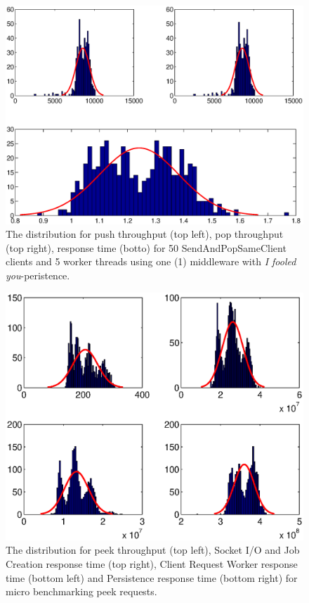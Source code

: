 \documentclass{article}
\begin{document}
        \begin{figure}[hbtp]
        \centering
        \centerline{\includegraphics[scale=0.5]{img/histfit_i_fooled_you_5_thrds}}
        \caption{The distribution for push throughput (top left), pop throughput (top right), response time (botto) for 50 SendAndPopSameClient clients and 5 worker threads using one (1) middleware with \textit{I fooled you}-peristence.}
        \end{figure}
        
        
        \begin{figure}[hbtp]
        \centering
        \centerline{\includegraphics[scale=0.5]{img/histfit_peek_io_crw_db}}
        \caption{The distribution for peek throughput (top left), Socket I/O and Job Creation response time (top right), Client Request Worker response time (bottom left) and Persistence response time (bottom right) for micro benchmarking peek requests.}
        \end{figure}
        
\end{document}
